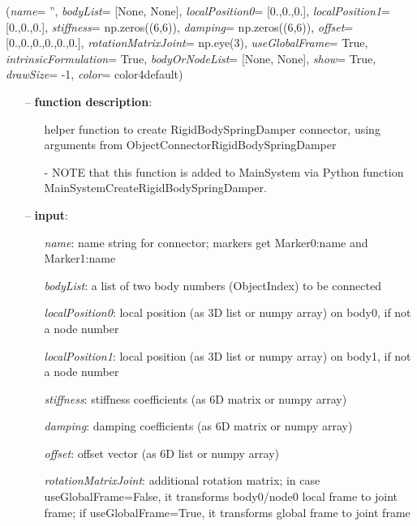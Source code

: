 %
\begin{flushleft}
\label{sec:mainsystemextensions:CreateRigidBodySpringDamper}
({\it name}= '', {\it bodyList}= [None, None], {\it localPosition0}= [0.,0.,0.], {\it localPosition1}= [0.,0.,0.], {\it stiffness}= np.zeros((6,6)), {\it damping}= np.zeros((6,6)), {\it offset}= [0.,0.,0.,0.,0.,0.], {\it rotationMatrixJoint}= np.eye(3), {\it useGlobalFrame}= True, {\it intrinsicFormulation}= True, {\it bodyOrNodeList}= [None, None], {\it show}= True, {\it drawSize}= -1, {\it color}= color4default)
\end{flushleft}
\setlength{\itemindent}{0.7cm}
\begin{itemize}[leftmargin=0.7cm]
\item[--]
{\bf function description}: \vspace{-6pt}
\begin{itemize}[leftmargin=1.2cm]
\setlength{\itemindent}{-0.7cm}
\item[]helper function to create RigidBodySpringDamper connector, using arguments from ObjectConnectorRigidBodySpringDamper
\item[]- NOTE that this function is added to MainSystem via Python function MainSystemCreateRigidBodySpringDamper.
\end{itemize}
\item[--]
{\bf input}: \vspace{-6pt}
\begin{itemize}[leftmargin=1.2cm]
\setlength{\itemindent}{-0.7cm}
\item[]{\it name}: name string for connector; markers get Marker0:name and Marker1:name
\item[]{\it bodyList}: a list of two body numbers (ObjectIndex) to be connected
\item[]{\it localPosition0}: local position (as 3D list or numpy array) on body0, if not a node number
\item[]{\it localPosition1}: local position (as 3D list or numpy array) on body1, if not a node number
\item[]{\it stiffness}: stiffness coefficients (as 6D matrix or numpy array)
\item[]{\it damping}: damping coefficients (as 6D matrix or numpy array)
\item[]{\it offset}: offset vector (as 6D list or numpy array)
\item[]{\it rotationMatrixJoint}: additional rotation matrix; in case  useGlobalFrame=False, it transforms body0/node0 local frame to joint frame; if useGlobalFrame=True, it transforms global frame to joint frame

\end{itemize}
\end{itemize}
